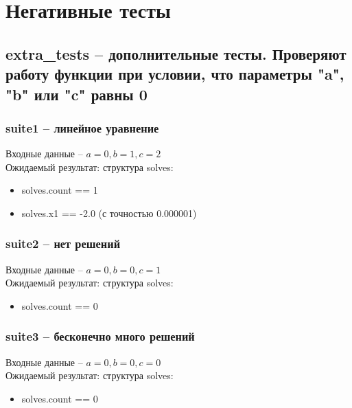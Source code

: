 \documentclass{article}
\begin{document}
\section{Негативные тесты}
\subsection{extra\_tests -- дополнительные тесты. Проверяют работу функции при условии, что параметры "a", "b" или "c" равны 0}
\subsubsection{suite1 -- линейное уравнение}
Входные данные -- $a=0, b=1, c=2$\\
Ожидаемый результат: структура solves:
\begin{itemize}
    \item solves.count == 1
    \item solves.x1 == -2.0 (с точностью 0.000001)
\end{itemize}
\subsubsection{suite2 -- нет решений}
Входные данные -- $a=0, b=0, c=1$\\
Ожидаемый результат: структура solves:
\begin{itemize}
    \item solves.count == 0
\end{itemize}
\subsubsection{suite3 -- бесконечно много решений}
Входные данные -- $a=0, b=0, c=0$\\
Ожидаемый результат: структура solves:
\begin{itemize}
    \item solves.count == 0
\end{itemize}
\end{document}
